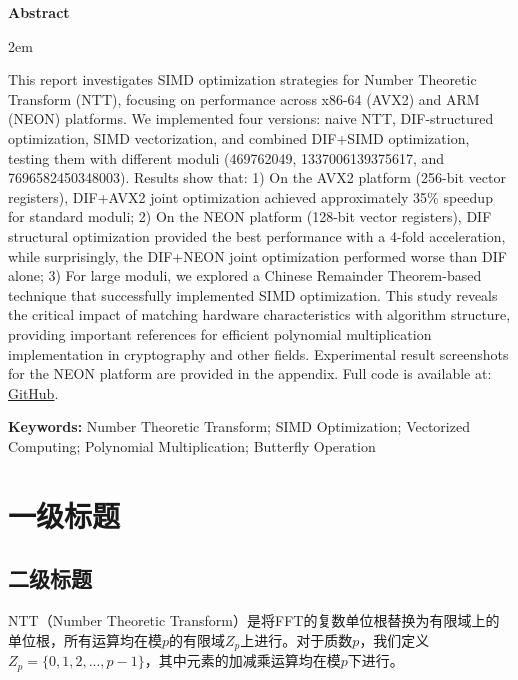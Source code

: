 \documentclass[a4paper,colorlinks=true,linkcolor=blue,urlcolor=blue,citecolor=green,bookmarks=true]{article}
\newenvironment{enabstract}{
    \par\small
    \noindent\mbox{}\par\vspace{-\baselineskip}
    \par\parindent 2em
    }
    {\par\vspace{1em}}
\begin{document}
\begin{center}{\bfseries{Abstract}}\end{center}\par\vspace{0.5em}
\begin{enabstract}
This report investigates SIMD optimization strategies for Number Theoretic Transform (NTT), focusing on performance across x86-64 (AVX2) and ARM (NEON) platforms. We implemented four versions: naive NTT, DIF-structured optimization, SIMD vectorization, and combined DIF+SIMD optimization, testing them with different moduli (469762049, 1337006139375617, and 7696582450348003). Results show that: 1) On the AVX2 platform (256-bit vector registers), DIF+AVX2 joint optimization achieved approximately 35\% speedup for standard moduli; 2) On the NEON platform (128-bit vector registers), DIF structural optimization provided the best performance with a 4-fold acceleration, while surprisingly, the DIF+NEON joint optimization performed worse than DIF alone; 3) For large moduli, we explored a Chinese Remainder Theorem-based technique that successfully implemented SIMD optimization. This study reveals the critical impact of matching hardware characteristics with algorithm structure, providing important references for efficient polynomial multiplication implementation in cryptography and other fields. Experimental result screenshots for the NEON platform are provided in the appendix. Full code is available at: \href{https://github.com/aokimi0/parallel-programming}{GitHub}.

\vspace{1em}
\noindent\textbf{Keywords:} Number Theoretic Transform; SIMD Optimization; Vectorized Computing; Polynomial Multiplication; Butterfly Operation
\end{enabstract}

\clearpage
\tableofcontents
\clearpage

\section{一级标题}


\subsection{二级标题}
NTT（Number Theoretic Transform）是将FFT的复数单位根替换为有限域上的单位根，所有运算均在模$p$的有限域$Z_p$上进行。对于质数$p$，我们定义$Z_p=\{0,1,2,...,p-1\}$，其中元素的加减乘运算均在模$p$下进行\cite{harvey2014}。
\end{document}
